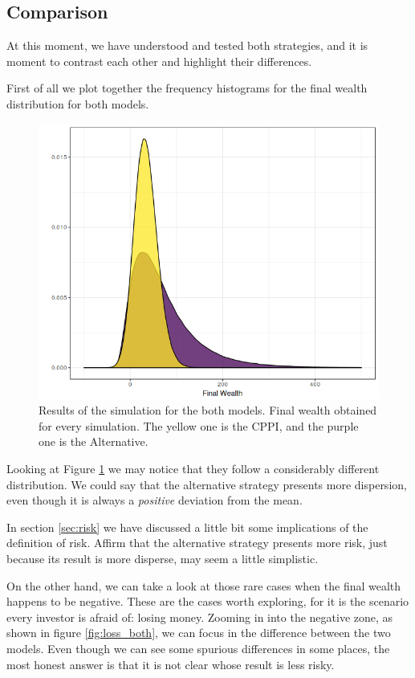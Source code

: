 \subsection{Comparison}

At this moment, we have understood and tested both strategies, and it is moment to contrast each other and highlight their differences.

First of all we plot together the frequency histograms for the final wealth distribution for both models.

\begin{figure}[h]
    \centering
    \includegraphics[scale=0.65]{./images/fw_both.png}
    \caption{Results of the simulation for the both models. Final wealth obtained for every simulation. The yellow one is the CPPI, and the purple one is the Alternative.}
    \label{fig:both_fw}
\end{figure}

Looking at Figure \ref{fig:both_fw} we may notice that they follow a considerably different distribution. We could say that the alternative strategy presents more dispersion, even though it is always a \textit{positive} deviation from the mean.

In section \ref{sec:risk} we have discussed a little bit some implications of the definition of risk. Affirm that the alternative strategy presents more risk, just because its result is more disperse, may seem a little simplistic.

On the other hand, we can take a look at those rare cases when the final wealth happens to be negative. These are the cases worth exploring, for it is the scenario every investor is afraid of: losing money. Zooming in into the negative zone, as shown in figure \ref{fig:loss_both}, we can focus in the difference between the two models. Even though we can see some spurious differences in some places, the most honest answer is that it is not clear whose result is less risky.

